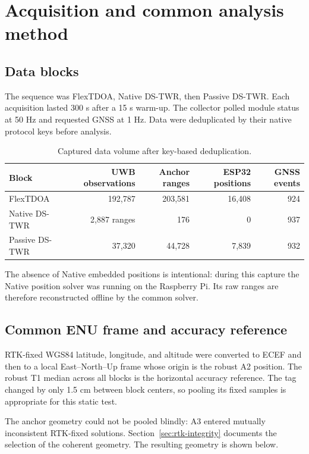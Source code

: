 \documentclass[11pt,a4paper]{article}
\begin{document}
\section{Acquisition and common analysis method}

\subsection{Data blocks}

The sequence was FlexTDOA, Native DS-TWR, then Passive DS-TWR. Each acquisition
lasted 300 s after a 15 s warm-up. The collector polled module status at 50 Hz
and requested GNSS at 1 Hz. Data were deduplicated by their native protocol
keys before analysis.

\begin{table}[H]
  \centering
  \caption{Captured data volume after key-based deduplication.}
  \small
  \begin{tabular}{lrrrr}
    \toprule
    Block & UWB observations & Anchor ranges & ESP32 positions & GNSS events\\
    \midrule
    FlexTDOA & 192,787 & 203,581 & 16,408 & 924\\
    Native DS-TWR & 2,887 ranges & 176 & 0 & 937\\
    Passive DS-TWR & 37,320 & 44,728 & 7,839 & 932\\
    \bottomrule
  \end{tabular}
\end{table}

The absence of Native embedded positions is intentional: during this capture
the Native position solver was running on the Raspberry Pi. Its raw ranges are
therefore reconstructed offline by the common solver.

\subsection{Common ENU frame and accuracy reference}

RTK-fixed WGS84 latitude, longitude, and altitude were converted to ECEF and
then to a local East--North--Up frame whose origin is the robust A2 position.
The robust T1 median across all blocks is the horizontal accuracy reference.
The tag changed by only 1.5 cm between block centers, so pooling its fixed
samples is appropriate for this static test.

The anchor geometry could not be pooled blindly: A3 entered mutually
inconsistent RTK-fixed solutions. Section~\ref{sec:rtk-integrity} documents the
selection of the coherent geometry. The resulting geometry is shown below.
\end{document}
